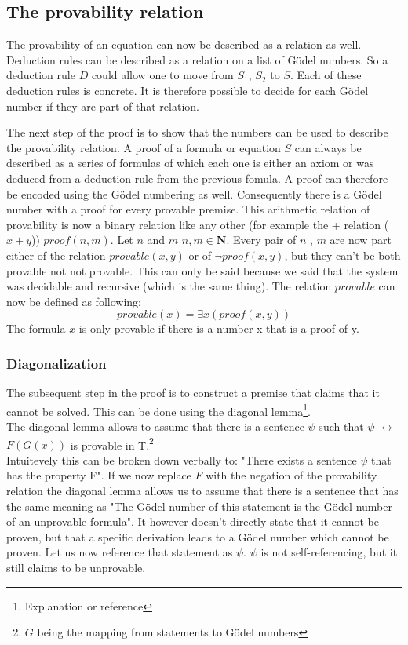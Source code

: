 \documentclass[english,12pt]{article}
\begin{document}
\subsection{The provability relation}
The provability of an equation can now be described as a relation as well. Deduction rules can be described as a relation on a list of Gödel numbers. So a deduction rule $D$  could allow one to move from $S_1$, $S_2$ to $S$. Each of these deduction rules is concrete. It is therefore possible to decide for each Gödel number if they are part of that relation.

The next step of the proof is to show that the numbers can be used to describe the provability relation. A proof of a formula or equation $S$ can always be described as a series of formulas of which each one is either an axiom or was deduced from a deduction rule from the previous fomula. A proof can therefore be encoded using the Gödel numbering as well. Consequently there is a Gödel number with a proof for every provable premise. This arithmetic relation of provability is now a binary relation like any other (for example the + relation ($x + y$)) $proof(n, m)$. Let $n$ and $m$ $n, m \in \mathbf{N}$. Every pair of $n$
, $m$ are now part either of the relation $provable(x, y)$ or of $\neg proof(x, y)$, but they can't be both provable not not provable. This can only be said because we said that the system was decidable and recursive (which is the same thing). The relation $provable$ can now be defined as following:
$$
    provable(x) = \exists x (proof(x, y))
$$
The formula $x$ is only provable if there is a number x that is a proof of y.
\subsubsection{Diagonalization}
The subsequent step in the proof is to construct a premise that claims that it cannot be solved. This can be done using the diagonal lemma\footnote{Explanation or reference}.\\
The diagonal lemma allows to assume that there is a sentence $\psi$ such that $\psi$ $\leftrightarrow$ $F(G(x))$ is provable in T.\footnote{$G$ being the mapping from statements to Gödel numbers}\\
Intuitevely this can be broken down verbally to: "There exists a sentence $\psi$ that has the property F". If we now replace $F$ with the negation of the provability relation the diagonal lemma allows us to assume that there is a sentence that has the same meaning as "The Gödel number of this statement is the Gödel number of an unprovable formula". It however doesn't directly state that it cannot be proven, but that a specific derivation leads to a Gödel number which cannot be proven. Let us now reference that statement as $\psi$. $\psi$ is not self-referencing, but it still claims to be unprovable.
\end{document}
